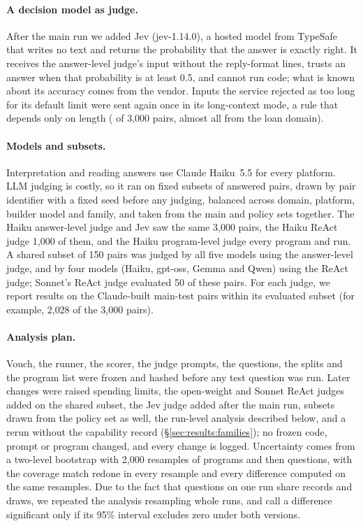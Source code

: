 \paragraph{A decision model as judge.} After the main run we added Jev (jev-1.14.0), a hosted model from TypeSafe~\cite{typesafe2026jev} that writes no text and returns the probability that the answer is exactly right. It receives the answer-level judge's input without the reply-format lines, trusts an answer when that probability is at least 0.5, and cannot run code; what is known about its accuracy comes from the vendor. Inputs the service rejected as too long for its default limit were sent again once in its long-context mode, a rule that depends only on length (\rJevLongRows{} of 3{,}000 pairs, almost all from the loan domain).

\paragraph{Models and subsets.} Interpretation and reading answers use Claude Haiku~5.5 for every platform. LLM judging is costly, so it ran on fixed subsets of answered pairs, drawn by pair identifier with a fixed seed before any judging, balanced across domain, platform, builder model and family, and taken from the main and policy sets together. The Haiku answer-level judge and Jev saw the same 3{,}000 pairs, the Haiku ReAct judge 1{,}000 of them, and the Haiku program-level judge every program and run. A shared subset of 150 pairs was judged by all five models using the answer-level judge, and by four models (Haiku, gpt-oss, Gemma and Qwen) using the ReAct judge; Sonnet's ReAct judge evaluated 50 of these pairs. For each judge, we report results on the Claude-built main-test pairs within its evaluated subset (for example, 2{,}028 of the 3{,}000 pairs).

\paragraph{Analysis plan.} Vouch, the runner, the scorer, the judge prompts, the questions, the splits and the program list were frozen and hashed before any test question was run. Later changes were raised spending limits, the open-weight and Sonnet ReAct judges added on the shared subset, the Jev judge added after the main run, subsets drawn from the policy set as well, the run-level analysis described below, and a rerun without the capability record (\S\ref{sec:results:families}); no frozen code, prompt or program changed, and every change is logged. Uncertainty comes from a two-level bootstrap with 2{,}000 resamples of programs and then questions, with the coverage match redone in every resample and every difference computed on the same resamples. Due to the fact that questions on one run share records and draws, we repeated the analysis resampling whole runs, and call a difference significant only if its 95\% interval excludes zero under both versions.
